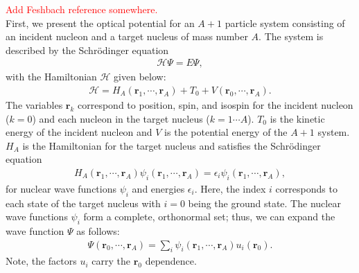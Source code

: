 \documentclass[preprintnumbers,floatfix,aps,prc,preprint,nofootinbib]{revtex4-1}
\begin{document}
\textcolor{red}{Add Feshbach reference somewhere.}
\\

First, we present the optical potential for an $A+1$ particle system consisting of an incident nucleon and a target nucleus of mass number $A$. The system is described by the Schr\"odinger equation
%
\begin{eqnarray}
	\label{eq:schrodinger_equation}
	\mathcal{H} \Psi = E \Psi,
\end{eqnarray}
%
with the Hamiltonian $\mathcal{H}$ given below:
%
\begin{eqnarray}
	\label{eq:total_hamiltonian}
	\mathcal{H} = H_A(\textbf{r}_1, \cdots , \textbf{r}_A) + T_0 + V(\textbf{r}_0, \cdots , \textbf{r}_A).
\end{eqnarray}
%
The variables $\textbf{r}_k$ correspond to position, spin, and isospin for the incident nucleon ($k=0$) and each nucleon in the target nucleus ($k=1 \cdots A$). $T_0$ is the kinetic energy of the incident nucleon and $V$ is the potential energy of the $A+1$ system. $H_A$ is the Hamiltonian for the target nucleus and satisfies the Schr\"odinger equation
%
\begin{eqnarray}
	\label{eq:nuclear_schrodinger_equation}
	H_A(\textbf{r}_1, \cdots , \textbf{r}_A) \psi_i(\textbf{r}_1, \cdots , \textbf{r}_A) = \epsilon_i \psi_i(\textbf{r}_1, \cdots , \textbf{r}_A),
\end{eqnarray}
%
for nuclear wave functions $\psi_i$ and energies $\epsilon_i$. Here, the index $i$ corresponds to each state of the target nucleus with $i=0$ being the ground state. The nuclear wave functions $\psi_i$ form a complete, orthonormal set; thus, we can expand the wave function $\Psi$ as follows:
%
\begin{eqnarray}
	\label{eq:wave_function}
	\Psi(\textbf{r}_0, \cdots , \textbf{r}_A) = \sum_{i} \psi_i(\textbf{r}_1, \cdots , \textbf{r}_A) u_i(\textbf{r}_0).
\end{eqnarray}
%
Note, the factors $u_i$ carry the $\textbf{r}_0$ dependence.
\\
\end{document}
